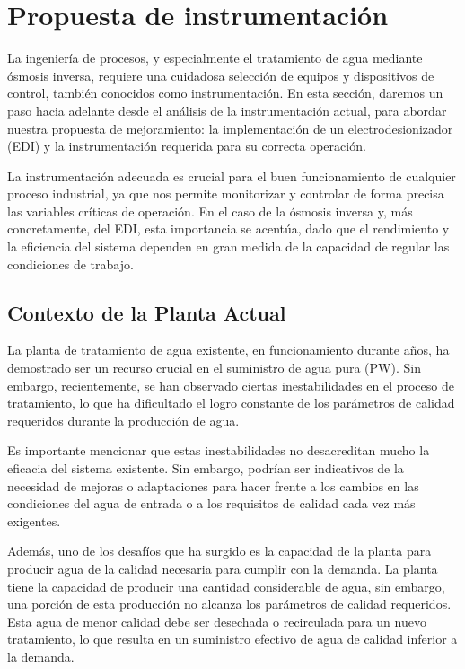 \section{Propuesta de instrumentación}

La ingeniería de procesos, y especialmente el tratamiento de agua mediante ósmosis inversa, requiere una cuidadosa selección de equipos y dispositivos de control, también conocidos como instrumentación. En esta sección, daremos un paso hacia adelante desde el análisis de la instrumentación actual, para abordar nuestra propuesta de mejoramiento: la implementación de un electrodesionizador (EDI) y la instrumentación requerida para su correcta operación.

La instrumentación adecuada es crucial para el buen funcionamiento de cualquier proceso industrial, ya que nos permite monitorizar y controlar de forma precisa las variables críticas de operación. En el caso de la ósmosis inversa y, más concretamente, del EDI, esta importancia se acentúa, dado que el rendimiento y la eficiencia del sistema dependen en gran medida de la capacidad de regular las condiciones de trabajo.


\subsection{Contexto de la Planta Actual}

La planta de tratamiento de agua existente, en funcionamiento durante años,
ha demostrado ser un recurso crucial en el suministro de agua pura (PW).
Sin embargo, recientemente, se han observado ciertas inestabilidades en el
proceso de tratamiento, lo que ha dificultado el logro constante de los parámetros
de calidad requeridos durante la producción de agua.

Es importante mencionar que estas inestabilidades no desacreditan mucho la eficacia
del sistema existente. Sin embargo, podrían ser indicativos de la necesidad
de mejoras o adaptaciones para hacer frente a los cambios en las condiciones
del agua de entrada o a los requisitos de calidad cada vez más exigentes.

Además, uno de los desafíos que ha surgido es la capacidad de la
planta para producir agua de la calidad necesaria para cumplir con la demanda.
La planta tiene la capacidad de producir una cantidad considerable de agua,
sin embargo, una porción de esta producción no alcanza los parámetros de
calidad requeridos. Esta agua de menor calidad debe ser desechada o
recirculada para un nuevo tratamiento, lo que resulta en un suministro
efectivo de agua de calidad inferior a la demanda.

